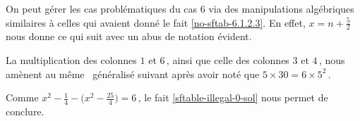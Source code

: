 \begin{remark}
	On peut gérer les cas problématiques du cas $6$ via des manipulations algébriques similaires à celles qui avaient donné le fait \ref{no-sftab-6.1.2.3}.
	En effet, $x = n + \frac52$ nous donne ce qui suit avec un abus de notation évident.
	\begin{center}
	\end{center}
	
	La multiplication des colonnes $1$ et $6$\,, ainsi que celle des colonnes $3$ et $4$\,, nous amènent au même \sftab\ généralisé suivant après avoir noté que $5 \times 30 = 6 \times 5^2$\,.
	\begin{center}
	\end{center}
	
	
	Comme $x^2 - \frac14 - \big( x^2 - \frac{25}{4} \big) = 6$\,, le fait \ref{sftable-illegal-0-sol} nous permet de conclure.
\end{remark}

